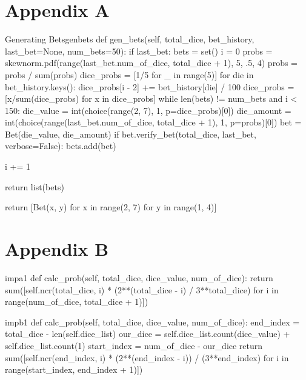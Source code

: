 \begin{appendices}
    \chapter{Appendix A}
    \label{ch:apA}

    \begin{myminted}{Generating Bets}{genbets}
        def gen_bets(self, total_dice, bet_history, last_bet=None, num_bets=50):
            if last_bet:
                bets = set()
                i = 0
                probs = skewnorm.pdf(range(last_bet.num_of_dice, total_dice + 1), 5, .5, 4)
                probs = probs / sum(probs)
                dice_probs = [1/5 for _ in range(5)]
                for die in bet_history.keys():
                    dice_probs[i - 2] += bet_history[die] / 100
                dice_probs = [x/sum(dice_probs) for x in dice_probs]
                while len(bets) != num_bets and i < 150:
                    die_value = int(choice(range(2, 7), 1, p=dice_probs)[0])
                    die_amount = int(choice(range(last_bet.num_of_dice, total_dice + 1), 1, p=probs)[0])
                    bet = Bet(die_value, die_amount)
                    if bet.verify_bet(total_dice, last_bet, verbose=False):
                        bets.add(bet)

                    i += 1

                return list(bets)

            return [Bet(x, y) for x in range(2, 7) for y in range(1, 4)]
    \end{myminted}

    \chapter{Appendix B}

    \begin{myminted}{}{impa1}
        def calc_prob(self, total_dice, dice_value, num_of_dice):
            return sum([self.ncr(total_dice, i) * (2**(total_dice - i) / 3**total_dice)
                        for i in range(num_of_dice, total_dice + 1)])
    \end{myminted}

    \begin{myminted}{}{impb1}
        def calc_prob(self, total_dice, dice_value, num_of_dice):
            end_index = total_dice - len(self.dice_list)
            our_dice = self.dice_list.count(dice_value) + self.dice_list.count(1)
            start_index = num_of_dice - our_dice
            return sum([self.ncr(end_index, i) * (2**(end_index - i)) / (3**end_index)
                        for i in range(start_index, end_index + 1)])
    \end{myminted}


\end{appendices}
